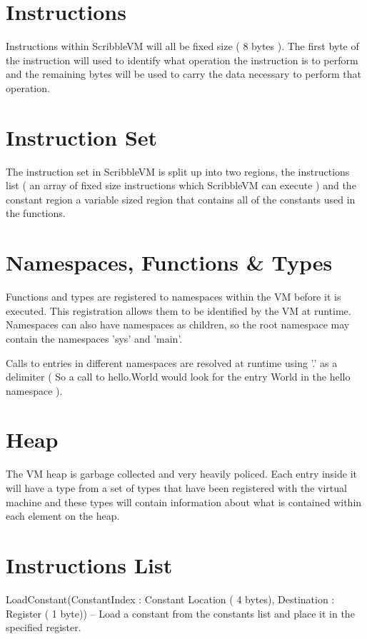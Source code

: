 \documentclass[]{final_report}
\begin{document}
\section{Instructions}

Instructions within ScribbleVM will all be fixed size ( 8 bytes ). The first byte of the instruction will used to
identify what operation the instruction is to perform and the remaining bytes will be used to carry the data
necessary to perform that operation.

\section{Instruction Set}

The instruction set in ScribbleVM is split up into two regions, the instructions list ( an array of fixed size
instructions which ScribbleVM can execute ) and the constant region a variable sized region that contains all
of the constants used in the functions. 

\section{Namespaces, Functions \& Types}

Functions and types are registered to namespaces within the VM before it is executed. This registration
allows them to be identified by the VM at runtime.
Namespaces can also have namespaces as children, so the root namespace may contain the namespaces
'sys' and 'main'.

Calls to entries in different namespaces are resolved at runtime using '.' as a delimiter ( So a call to
hello.World would look for the entry World in the hello namespace ).

\section{Heap}

The VM heap is garbage collected and very heavily policed. Each entry inside it will have a type from a set of
types that have been registered with the virtual machine and these types will contain information about what
is contained within each element on the heap.

\section{Instructions List}

LoadConstant(ConstantIndex : Constant Location ( 4 bytes), Destination : Register ( 1 byte)) – Load a constant from the constants list and place it in the specified register.
\end{document}
